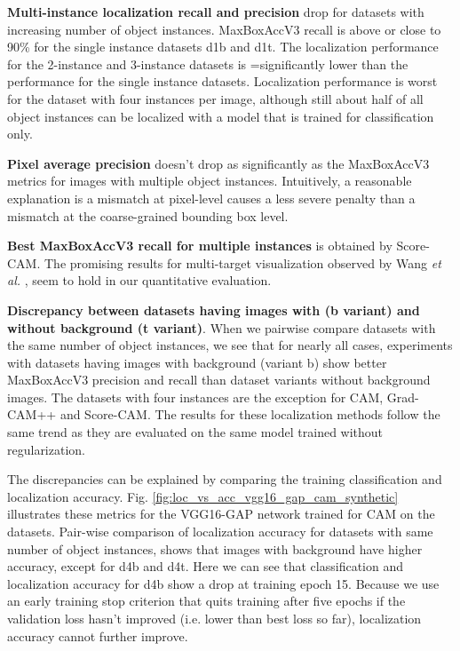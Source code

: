 \textbf{Multi-instance localization recall and precision} drop for datasets with increasing number of object instances. MaxBoxAccV3 recall is above or close to 90\% for the single instance datasets d1b and d1t. The localization performance for the 2-instance and 3-instance datasets is =significantly lower than the performance for the single instance datasets. Localization performance is worst for the dataset with four instances per image, although still about half of all object instances can be localized with a model that is trained for classification only.

\textbf{Pixel average precision} doesn't drop as significantly as the MaxBoxAccV3 metrics for images with multiple object instances. Intuitively, a reasonable explanation is a mismatch at pixel-level causes a less severe penalty than a mismatch at the coarse-grained bounding box level.

\textbf{Best MaxBoxAccV3 recall for multiple instances} is obtained by Score-CAM. The promising results for multi-target visualization observed by Wang \textit{et al.} \cite{wang2020score}, seem to hold in our quantitative evaluation. 

\textbf{Discrepancy between datasets having images with (b variant) and without background (t variant)}. When we pairwise compare datasets with the same number of object instances, we see that for nearly all cases, experiments with datasets having images with background (variant b) show better MaxBoxAccV3 precision and recall than dataset variants without background images. The datasets with four instances are the exception for CAM, Grad-CAM++ and Score-CAM. The results for these localization methods follow the same trend as they are evaluated on the same model trained without regularization. 

The discrepancies can be explained by comparing the training classification and localization accuracy. Fig. \ref{fig:loc_vs_acc_vgg16_gap_cam_synthetic}  illustrates these metrics for the VGG16-GAP network trained for CAM on the datasets. Pair-wise comparison of localization accuracy for datasets with same number of object instances, shows that images with background have higher accuracy, except for d4b and d4t. Here we can see that classification and localization accuracy for d4b show a drop at training epoch 15. Because we use an early training stop criterion that quits training after five epochs if the validation loss hasn't improved (i.e. lower than best loss so far), localization accuracy cannot further improve.

